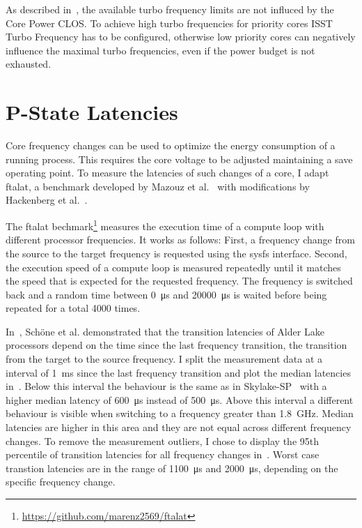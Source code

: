 As described in~, the available turbo frequency limits are not influced by the Core Power CLOS.
To achieve high turbo frequencies for priority cores ISST Turbo Frequency has to be configured, otherwise low priority cores can negatively influence the maximal turbo frequencies, even if the power budget is not exhausted.

\section{P-State Latencies}
\label{sec:pstate_latencies}

Core frequency changes can be used to optimize the energy consumption of a running process.
This requires the core voltage to be adjusted maintaining a save operating point.
To measure the latencies of such changes of a core, I adapt ftalat, a benchmark developed by Mazouz et al.~\cite{Mazouz_2014_ftalat} with modifications by Hackenberg et al.~\cite{Hackenberg_2015_Haswell}.

The ftalat bechmark\footnote{\url{https://github.com/marenz2569/ftalat}} measures the execution time of a compute loop with different processor frequencies.
It works as follows:
First, a frequency change from the source to the target frequency is requested using the sysfs interface.
Second, the execution speed of a compute loop is measured repeatedly until it matches the speed that is expected for the requested frequency.
The frequency is switched back and a random time between \SI{0}{\us} and \SI{20000}{\us} is waited before being repeated for a total \SI{4000}{} times.

In~\cite{Schoene_2024_Alder_Lake}, Schöne et al. demonstrated that the transition latencies of Alder Lake processors depend on the time since the last frequency transition, the transition from the target to the source frequency.
I split the measurement data at a interval of \SI{1}{\ms} since the last frequency transition and plot the median latencies in~.
Below this interval the behaviour is the same as in Skylake-SP~\cite{Schoene_2019_SKL} with a higher median latency of \SI{600}{\us} instead of \SI{500}{\us}.
Above this interval a different behaviour is visible when switching to a frequency greater than \SI{1.8}{\GHz}.
Median latencies are higher in this area and they are not equal across different frequency changes.
To remove the measurement outliers, I chose to display the 95th percentile of transition latencies for all frequency changes in~.
Worst case transtion latencies are in the range of \SI{1100}{\us} and \SI{2000}{\us}, depending on the specific frequency change.

